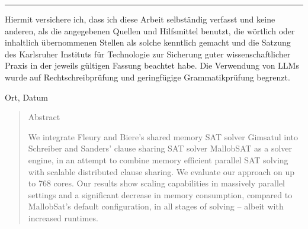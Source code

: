 \documentclass[12pt,a4paper,twoside]{scrartcl}
\numberwithin{equation}{section}
\begin{document}

\vspace*{0pt}\vfill

\hrule\medskip

Hiermit versichere ich, dass ich diese Arbeit selbständig verfasst und keine anderen, als die angegebenen Quellen und Hilfsmittel benutzt, die wörtlich oder inhaltlich übernommenen Stellen als solche kenntlich gemacht und die Satzung des Karlsruher Instituts für Technologie zur Sicherung guter wissenschaftlicher Praxis in der jeweils gültigen Fassung beachtet habe. Die Verwendung von LLMs wurde auf Rechtschreibprüfung und geringfügige Grammatikprüfung begrenzt.

\bigskip

\noindent
Ort, Datum


\vspace*{5cm}

\clearpage


\vspace*{0pt}\vfill

%
%
%

\begin{abstract}
\centerline{Abstract}
  We integrate Fleury and Biere's shared memory SAT solver Gimsatul \cite{gimsatul} into Schreiber and Sanders' clause sharing SAT solver MallobSAT \cite{mallobSat} as a solver engine, in an attempt to combine memory efficient parallel SAT solving with scalable distributed clause sharing. We evaluate our approach on up to 768 cores. Our results show scaling capabilities in massively parallel settings and a significant decrease in memory consumption, compared to MallobSat's default configuration, in all stages of solving -- albeit with increased runtimes.
\end{abstract}

\vfill\vfill\vfill
\clearpage


% 
% 
% 
\end{document}
